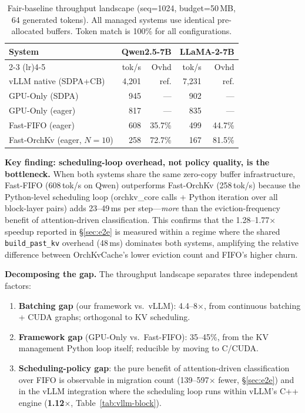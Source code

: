 \documentclass[conference]{IEEEtran}
\begin{document}
\begin{table}[t]
\centering
\caption{Fair-baseline throughput landscape (seq=1024, budget=50\,MB, 64 generated tokens). All managed systems use identical pre-allocated buffers. Token match is 100\% for all configurations.}
\label{tab:fair-baseline}
\footnotesize
\setlength{\tabcolsep}{9pt}
\begin{tabular}{@{}lrrrr@{}}
\toprule
System & \multicolumn{2}{c}{Qwen2.5-7B} & \multicolumn{2}{c}{LLaMA-2-7B} \\
\cmidrule(lr){2-3} \cmidrule(lr){4-5}
 & tok/s & Ovhd & tok/s & Ovhd \\
\midrule
vLLM native (SDPA+CB)        & 4{,}201 & ref.   & 7{,}231 & ref. \\
GPU-Only (SDPA)               & 945     & ---    & 902     & ---  \\
GPU-Only (eager)              & 817     & ---    & 835     & ---  \\
Fast-FIFO (eager)             & 608     & 35.7\% & 499    & 44.7\% \\
Fast-OrchKv (eager, $N{=}10$) & 258     & 72.7\% & 167    & 81.5\% \\
\bottomrule
\end{tabular}
\end{table}

\textbf{Key finding: scheduling-loop overhead, not policy quality, is the bottleneck.}
When both systems share the same zero-copy buffer infrastructure, Fast-FIFO (608\,tok/s on Qwen) outperforms Fast-OrchKv (258\,tok/s) because the Python-level scheduling loop (orchkv\_core calls + Python iteration over all block-layer pairs) adds 23--49\,ms per step---\emph{more} than the eviction-frequency benefit of attention-driven classification. This confirms that the 1.28--1.77$\times$ speedup reported in \S\ref{sec:e2e} is measured within a regime where the shared \texttt{build\_past\_kv} overhead (48\,ms) dominates both systems, amplifying the relative difference between OrchKvCache's lower eviction count and FIFO's higher churn.

\textbf{Decomposing the gap.} The throughput landscape separates three independent factors:
\begin{enumerate}
\item \textbf{Batching gap} (our framework vs.\ vLLM): 4.4--8$\times$, from continuous batching + CUDA graphs; orthogonal to KV scheduling.
\item \textbf{Framework gap} (GPU-Only vs.\ Fast-FIFO): 35--45\%, from the KV management Python loop itself; reducible by moving to C/CUDA.
\item \textbf{Scheduling-policy gap}: the pure benefit of attention-driven classification over FIFO is observable in migration count (139--597$\times$ fewer, \S\ref{sec:e2e}) and in the vLLM integration where the scheduling loop runs within vLLM's C++ engine (\textbf{1.12$\times$}, Table~\ref{tab:vllm-block}).
\end{enumerate}
\end{document}
